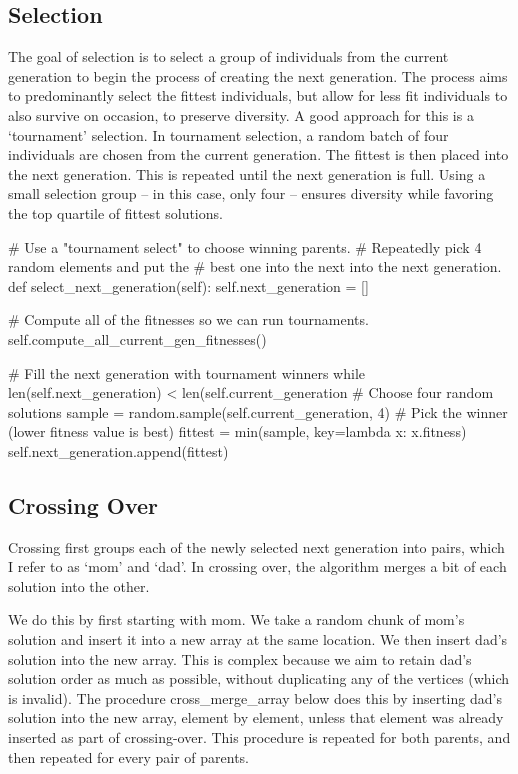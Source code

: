 \subsection{Selection}

The goal of selection is to select a group of individuals from the current generation to begin the process of creating the next generation. The process aims to predominantly select the fittest individuals, but allow for less fit individuals to also survive on occasion, to preserve diversity. A good approach for this is a `tournament' selection. In tournament selection, a random batch of four individuals are chosen from the current generation. The fittest is then placed into the next generation. This is repeated until the next generation is full. Using a small selection group -- in this case, only four -- ensures diversity while favoring the top quartile of fittest solutions. 

\begin{python}
  # Use a "tournament select" to choose winning parents.
  # Repeatedly pick 4 random elements and put the 
  # best one into the next into the next generation.
  def select_next_generation(self):
    self.next_generation = []

    # Compute all of the fitnesses so we can run tournaments.
    self.compute_all_current_gen_fitnesses()

    # Fill the next generation with tournament winners
    while len(self.next_generation) < len(self.current_generation
      # Choose four random solutions
      sample = random.sample(self.current_generation, 4)
      # Pick the winner (lower fitness value is best)
      fittest = min(sample, key=lambda x: x.fitness)
      self.next_generation.append(fittest)	
\end{python}

\subsection{Crossing Over}

Crossing first groups each of the newly selected next generation into pairs, which I refer to as `mom' and `dad'. In crossing over, the algorithm merges a bit of each solution into the other.

We do this by first starting with mom. We take a random chunk of mom's solution and insert it into a new array at the same location. We then insert dad's solution into the new array. This is complex because we aim to retain dad's solution order as much as possible, without duplicating any of the vertices (which is invalid). The procedure cross\_merge\_array below does this by inserting dad's solution into the new array, element by element, unless that element was already inserted as part of crossing-over. This procedure is repeated for both parents, and then repeated for every pair of parents. 

